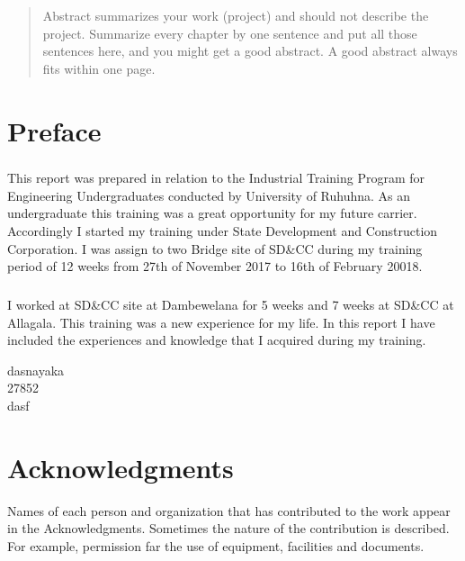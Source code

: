 \begin{abstract}
Abstract summarizes your work (project) and should not describe the project. Summarize every chapter by one sentence and put all those sentences here, and you might get a good abstract. A good abstract always fits within one page.
\end{abstract}

\chapter*{Preface}

\paragraph{}
This report was prepared in relation to the Industrial Training Program for Engineering Undergraduates conducted by University of Ruhuhna. As an undergraduate this training was a great opportunity for my future carrier. Accordingly I started my training under State Development and Construction Corporation. I was assign to two Bridge site of SD\&CC during my training period of 12 weeks from 27th of November 2017 to 16th of February 20018.
\paragraph{}
I worked at SD\&CC site at Dambewelana for 5 weeks and 7 weeks at SD\&CC at Allagala. This training was a new experience for my life. In this report I have included the experiences and knowledge that I acquired during my training. 

\vspace{10cm}
dasnayaka\\
27852\\
dasf\\
\chapter*{Acknowledgments}
Names of each person and organization that has contributed to the work appear in the Acknowledgments. Sometimes the nature of the contribution is described. For example, permission far the use of equipment, facilities and documents.

